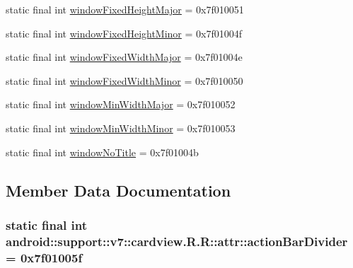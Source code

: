 \begin{CompactItemize}
\item 
static final int \hyperlink{classandroid_1_1support_1_1v7_1_1cardview_1_1_r_1_1attr_f31d36d07789f1666785e1342e24a4e1}{windowFixedHeightMajor} = 0x7f010051
\item 
static final int \hyperlink{classandroid_1_1support_1_1v7_1_1cardview_1_1_r_1_1attr_a01b43cb3c5747671e4ca146335eb990}{windowFixedHeightMinor} = 0x7f01004f
\item 
static final int \hyperlink{classandroid_1_1support_1_1v7_1_1cardview_1_1_r_1_1attr_4858d47beb0d2665475adbb7c28bc26f}{windowFixedWidthMajor} = 0x7f01004e
\item 
static final int \hyperlink{classandroid_1_1support_1_1v7_1_1cardview_1_1_r_1_1attr_a0530558127cced580c3396b44561412}{windowFixedWidthMinor} = 0x7f010050
\item 
static final int \hyperlink{classandroid_1_1support_1_1v7_1_1cardview_1_1_r_1_1attr_1553937225fb4cdcd668f8f6e3109563}{windowMinWidthMajor} = 0x7f010052
\item 
static final int \hyperlink{classandroid_1_1support_1_1v7_1_1cardview_1_1_r_1_1attr_1d6a13803509434832faafb90ba33fa8}{windowMinWidthMinor} = 0x7f010053
\item 
static final int \hyperlink{classandroid_1_1support_1_1v7_1_1cardview_1_1_r_1_1attr_8df2f8ece8ecad1a5c634274e3960e33}{windowNoTitle} = 0x7f01004b
\end{CompactItemize}


\subsection{Member Data Documentation}
\hypertarget{classandroid_1_1support_1_1v7_1_1cardview_1_1_r_1_1attr_9a1ad5d0e1aa2742c8a8343459249ce9}{
\subsubsection[{actionBarDivider}]{\setlength{\rightskip}{0pt plus 5cm}static final int android::support::v7::cardview.R.R::attr::actionBarDivider = 0x7f01005f}}
\label{classandroid_1_1support_1_1v7_1_1cardview_1_1_r_1_1attr_9a1ad5d0e1aa2742c8a8343459249ce9}


